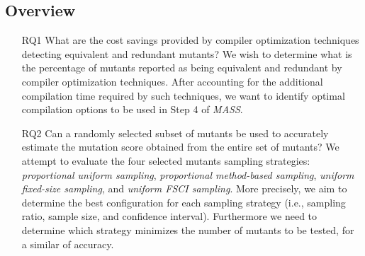 


\subsection{Overview}
\label{sec:evaluation}

\renewcommand{\APPR}{\textit{MASS}\xspace}

\STARTCHANGEDNOV



\begin{itemize}

    \item[RQ1] What are the cost savings provided by compiler optimization techniques detecting equivalent and redundant mutants?
    We wish to determine what is the percentage of mutants reported as being equivalent and redundant by compiler optimization techniques. After accounting for the additional compilation time required by such techniques, we want to identify optimal compilation options to be used in Step 4 of \APPR.

    \item[RQ2] Can a randomly selected subset of mutants be used to accurately estimate the mutation score obtained from the entire set of mutants? 
     {We attempt to evaluate the four selected mutants sampling strategies: \emph{proportional uniform sampling}, \emph{proportional method-based sampling},  \emph{uniform fixed-size sampling}, and \emph{uniform FSCI sampling}. More precisely, we aim to determine the best configuration for each sampling strategy (i.e., sampling ratio, sample size, and confidence interval). Furthermore we need to determine which strategy minimizes the number of mutants to be tested, for a similar of accuracy.}




\end{itemize}
